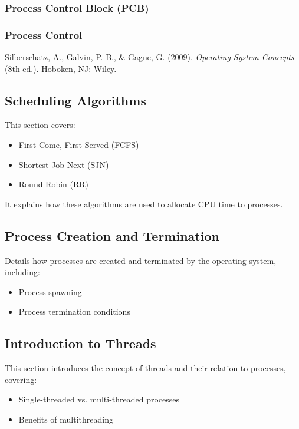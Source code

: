 \documentclass[12pt]{article}
\begin{document}
    \subsubsection {Process Control Block (PCB)}
    \subsubsection {Process Control}
    \begin{thebibliography}{9}
    Silberschatz, A., Galvin, P. B., \& Gagne, G. (2009). \textit{Operating System Concepts} (8th ed.). Hoboken, NJ: Wiley.
    \end{thebibliography}

\subsection{Scheduling Algorithms}
This section covers:
\begin{itemize}
    \item First-Come, First-Served (FCFS)
    \item Shortest Job Next (SJN)
    \item Round Robin (RR)
\end{itemize}
It explains how these algorithms are used to allocate CPU time to processes.

\subsection{Process Creation and Termination}
Details how processes are created and terminated by the operating system, including:
\begin{itemize}
    \item Process spawning
    \item Process termination conditions
\end{itemize}

\subsection{Introduction to Threads}
This section introduces the concept of threads and their relation to processes, covering:
\begin{itemize}
    \item Single-threaded vs. multi-threaded processes
    \item Benefits of multithreading
\end{itemize}
\end{document}
